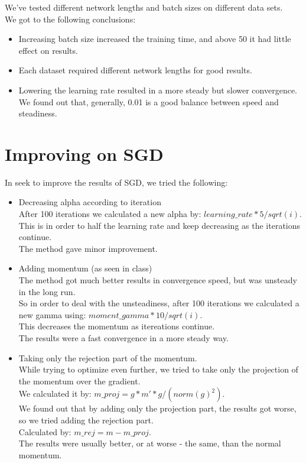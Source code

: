 \documentclass{article}
\numberwithin{equation}{section}
\begin{document}
We've tested different network lengths and batch sizes on different data sets.\\
We got to the following conclusions:\\
\begin{itemize}
  \item
  Increasing batch size increased the training time, and above 50 it had little effect on results.
  \item
  Each dataset required different network lengths for good results.
  \item
  Lowering the learning rate resulted in a more steady but slower convergence. We found out that, generally, 0.01 is a good balance between speed and steadiness.
\end{itemize}

\section{Improving on SGD}
In seek to improve the results of SGD, we tried the following:
\begin{itemize}
 \item 
 Decreasing alpha according to iteration\\
 After 100 iterations we calculated a new alpha by: $learning{\_}rate * 5 / sqrt(i)$.\\
 This is in order to half the learning rate and keep decreasing as the iterations continue.\\
 The method gave minor improvement.
 \item
 Adding momentum (as seen in class)\\
 The method got much better results in convergence speed, but was unsteady in the long run.\\
 So in order to deal with the unsteadiness, after 100 iterations we calculated a new gamma using: $moment{\_}gamma * 10 / sqrt(i)$.\\
 This decreases the momentum as itereations continue.\\
 The results were a fast convergence in a more steady way.
 \item
 Taking only the rejection part of the momentum.\\
 While trying to optimize even further, we tried to take only the projection of the momentum over the gradient.\\
 We calculated it by: $m{\_}proj = g * m' * g / (norm(g)^2)$.\\
 We found out that by adding only the projection part, the results got worse, so we tried adding the rejection part.\\
 Calculated by: $m{\_}rej = m - m{\_}proj$.\\
 The results were usually better, or at worse - the same, than the normal momentum.
\end{itemize}
\end{document}
